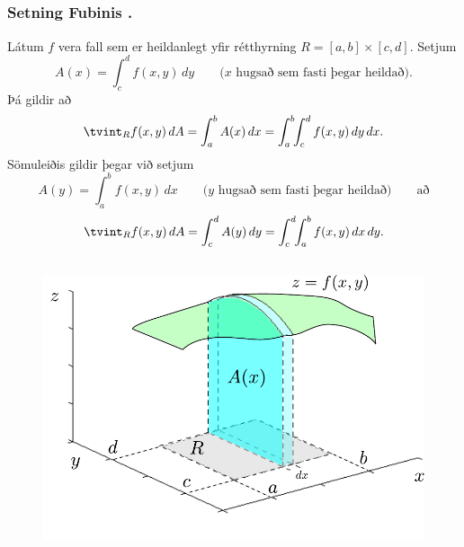 \subsection{} 

\subsubsection{Setning Fubinis \kaflanr.}

Látum $f$ vera fall sem er heildanlegt yfir rétthyrning $R=[a,b]\times
[c,d]$. Setjum
$$A(x)=\int_c^d f(x,y)\,dy\qquad\mbox{($x$ hugsað sem fasti þegar heildað)}.$$
Þá gildir að 
$$\tvint_R f(x,y)\,dA=\int_a^b A(x)\,dx=\int_a^b\!\!\int_c^d
f(x,y)\,dy\,dx.$$
Sömuleiðis gildir þegar við setjum 
$$A(y)=\int_a^b f(x,y)\,dx\qquad\mbox{($y$ hugsað sem fasti þegar heildað)} \qquad \text{að}$$
$$\tvint_R f(x,y)\,dA=\int_c^d A(y)\,dy=\int_c^d\!\!\int_a^b
f(x,y)\,dx\,dy.$$




\subsection{}
    \begin {figure}[h!]
 \centering
            \includegraphics[width=0.6\linewidth]{ax1}
            \caption*{}
\end {figure}

